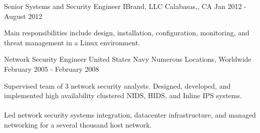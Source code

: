 \begin{cventries}
  \cventry
    {Senior Systems and Security Engineer} %
    {IBrand, LLC} %
    {Calabasas,, CA} %
    {Jan 2012 - August 2012} %
    {
      \begin{cvitems} %
        { Main responsibilities include design, installation, configuration, monitoring, and threat management in a Linux environment. }
      \end{cvitems}
    }

  \cventry
    {Network Security Engineer} %
    {United States Navy} %
    {Numerous Locations, Worldwide} %
    {February 2005 - February 2008} %
    {
      \begin{cvitems} %
        {Supervised team of 3 network security analysts. Designed, developed, and implemented high availability clustered NIDS, HIDS, and Inline IPS systems. \\~\\ Led network security systems integration, datacenter infrastructure, and managed networking for a several thousand host network.}
      \end{cvitems}
    }    
\end{cventries}

